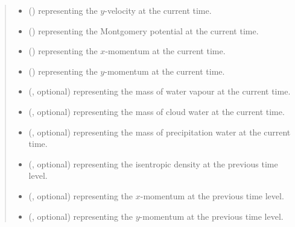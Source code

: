 \documentclass[letterpaper,10pt,english]{sphinxmanual}
\begin{document}
\begin{fulllineitems}
\begin{fulllineitems}
\begin{quote}
\begin{description}
\begin{itemize}
\item {} 
 () \textendash{}  representing the \(y\)-velocity at the current time.

\item {} 
 () \textendash{}  representing the Montgomery potential at the current time.

\item {} 
 () \textendash{}  representing the \(x\)-momentum at the current time.

\item {} 
 () \textendash{}  representing the \(y\)-momentum at the current time.

\item {} 
 (, optional) \textendash{}  representing the mass of water vapour at the current time.

\item {} 
 (, optional) \textendash{}  representing the mass of cloud water at the current time.

\item {} 
 (, optional) \textendash{}  representing the mass of precipitation water at the current time.

\item {} 
 (, optional) \textendash{}  representing the isentropic density at the previous time level.

\item {} 
 (, optional) \textendash{}  representing the \(x\)-momentum at the previous time level.

\item {} 
 (, optional) \textendash{}  representing the \(y\)-momentum at the previous time level.


\end{itemize}
\end{description}
\end{quote}
\end{fulllineitems}
\end{fulllineitems}
\end{document}

